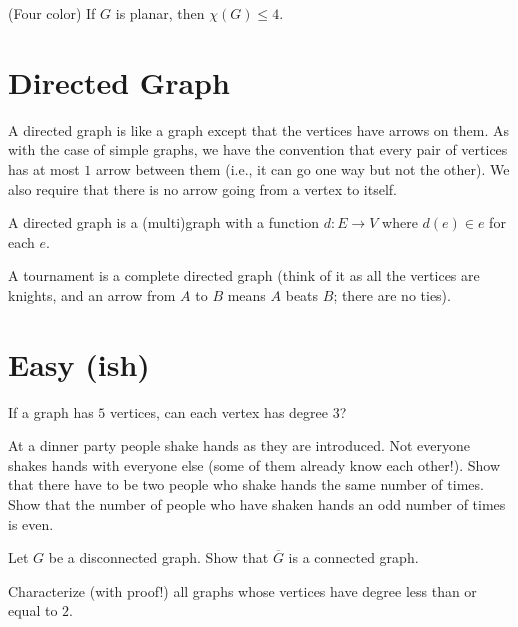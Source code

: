 \documentclass{article}
\begin{document}
\begin{theorem}(Four color)
If $G$ is planar, then $\chi(G)\leq 4$. 
\end{theorem}

\section{Directed Graph}
A directed graph is like a graph except that the vertices have arrows on them. As with the case of simple graphs, we have the convention that every pair of vertices has at most $1$ arrow between them (i.e., it can go one way but not the other). We also require that there is no arrow going from a vertex to itself.

\begin{definition}
A directed graph is a (multi)graph with a function $d: E \rightarrow V$ where $d(e) \in e$ for each $e$.  
\end{definition}

\begin{definition}
A tournament is a complete directed graph (think of it as all the vertices are knights, and an arrow from $A$ to $B$ means $A$ beats $B$; there are no ties).
\end{definition}

\section{Easy (ish)}
\begin{exercise}
If a graph has $5$ vertices, can each vertex has degree $3$? 
\end{exercise}

\begin{exercise}
At a dinner party people shake hands as they are introduced. Not everyone shakes hands with everyone else (some of them already know each other!). Show that there have to be two people who shake hands the same number of times. Show that the number of people who have shaken hands an odd number of times is even.
\end{exercise}

\begin{exercise}
Let $G$ be a disconnected graph. Show that $\overline{G}$ is a connected graph.
\end{exercise}

\begin{exercise}
Characterize (with proof!) all graphs whose vertices have degree less than or equal to $2$.
\end{exercise}
\end{document}
